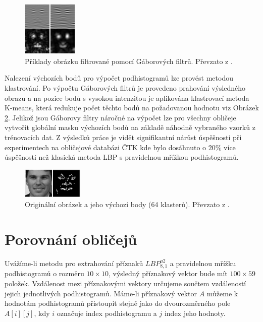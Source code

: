 \documentclass[czech,BP]{thesiskiv}
\begin{document}
\begin{figure}[h!]
\begin{center}
\includegraphics[width=100px]{img/gabor.png}
\caption{Příklady obrázku filtrované pomocí Gáborových filtrů. Převzato z \cite{LencKral2016}.}
\label{fig:gabor}
\end{center}
\end{figure}

Nalezení výchozích bodů pro výpočet podhistogramů lze provést metodou klastrování. Po výpočtu Gáborových filtrů je provedeno prahování výsledného obrazu a na pozice bodů s vysokou intenzitou je aplikována klastrovací metoda K-means, která redukuje počet těchto bodů na požadovanou hodnotu viz Obrázek \ref{fig:gabor_points}. Jelikož jsou Gáborovy filtry náročné na výpočet lze pro všechny obličeje vytvořit globální masku výchozích bodů na základě náhodně vybraného vzorků z trénovacích dat. Z výsledků práce \cite{LencKral2016} je vidět signifikantní nárůst úspěšnosti při experimentech na obličejové databázi ČTK kde bylo dosáhnuto o $20\%$ více úspěšnosti než klasická metoda LBP s pravidelnou mřížkou podhistogramů.

\begin{figure}[h!]
\begin{center}
\includegraphics[width=110px]{img/gabor_points.png}
\caption{Originální obrázek a jeho výchozí body (64 klasterů). Převzato z \cite{LencKral2016}.}
\label{fig:gabor_points}
\end{center}
\end{figure}

\section{Porovnání obličejů}
Uvážíme-li metodu pro extrahování příznaků $LBP_{8,1}^{u2}$ a pravidelnou mřížku podhistogramů o rozměru $10\times 10$, výsledný příznakový vektor bude mít $100 \times 59$ položek. Vzdálenost mezi příznakovými vektory určujeme součtem vzdáleností jejich jednotlivých podhistogramů. Máme-li příznakový vektor $A$ můžeme k hodnotám podhistogramů přistoupit stejně jako do dvourozměrného pole $A[i][j]$, kdy $i$ označuje index podhistogramu a $j$ index jeho hodnoty.  
\end{document}
